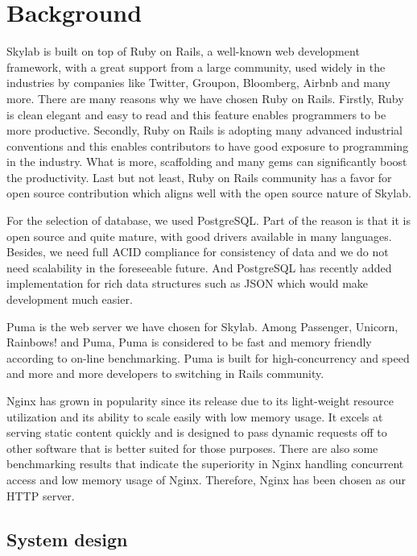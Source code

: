 \chapter{Background}

Skylab is built on top of Ruby on Rails, a well-known web development framework, with a great support from a large community, used widely in the industries by companies like Twitter, Groupon, Bloomberg, Airbnb and many more\cite{citation1}. There are many reasons why we have chosen Ruby on Rails. Firstly, Ruby is clean elegant and easy to read and this feature enables programmers to be more productive. Secondly, Ruby on Rails is adopting many advanced industrial conventions and this enables contributors to have good exposure to programming in the industry. What is more, scaffolding and many gems can significantly boost the productivity. Last but not least, Ruby on Rails community has a favor for open source contribution which aligns well with the open source nature of Skylab.

For the selection of database, we used PostgreSQL. Part of the reason is that it is open source and quite mature, with good drivers available in many languages\cite{citation2}. Besides, we need full ACID compliance for consistency of data and we do not need scalability in the foreseeable future. And PostgreSQL has recently added implementation for rich data structures such as JSON which would make development much easier\cite{citation3}.

Puma is the web server we have chosen for Skylab. Among Passenger, Unicorn, Rainbows! and Puma, Puma is considered to be fast and memory friendly according to on-line benchmarking\cite{citation4}. Puma is built for high-concurrency and speed and more and more developers to switching in Rails community\cite{citation5}.

Nginx has grown in popularity since its release due to its light-weight resource utilization and its ability to scale easily with low memory usage. It excels at serving static content quickly and is designed to pass dynamic requests off to other software that is better suited for those purposes\cite{citation6}. There are also some benchmarking results that indicate the superiority in Nginx handling concurrent access and low memory usage of Nginx\cite{citation7}. Therefore, Nginx has been chosen as our HTTP server.

\section{System design}

